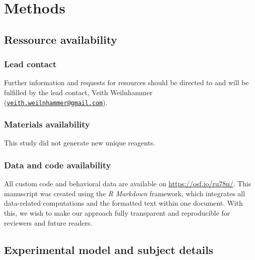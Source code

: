 \documentclass[
]{article}
\begin{document}
\newpage

\hypertarget{methods}{%
\section{Methods}\label{methods}}

\hypertarget{ressource-availability}{%
\subsection{Ressource availability}\label{ressource-availability}}

\hypertarget{lead-contact}{%
\subsubsection{Lead contact}\label{lead-contact}}

Further information and requests for resources should be directed to and
will be fulfilled by the lead contact, Veith Weilnhammer
(\href{mailto:veith.weilnhammer@gmail.com}{\nolinkurl{veith.weilnhammer@gmail.com}}).

\hypertarget{materials-availability}{%
\subsubsection{Materials availability}\label{materials-availability}}

This study did not generate new unique reagents.

\hypertarget{data-and-code-availability}{%
\subsubsection{Data and code
availability}\label{data-and-code-availability}}

All custom code and behavioral data are available on
\url{https://osf.io/ru78n/}. This manuscript was created using the
\emph{R Markdown} framework, which integrates all data-related
computations and the formatted text within one document. With this, we
wish to make our approach fully transparent and reproducible for
reviewers and future readers.

\hypertarget{experimental-model-and-subject-details}{%
\subsection{Experimental model and subject
details}\label{experimental-model-and-subject-details}}
\end{document}

